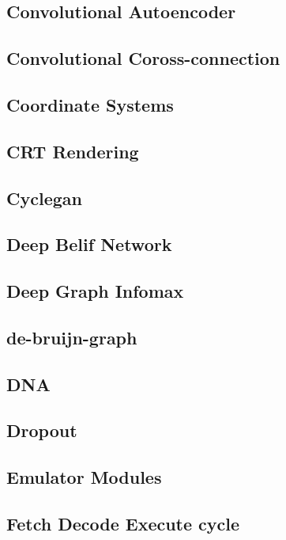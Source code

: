 \documentclass{article}
\newcommand{\example}[1]{
\resizebox{\linewidth}{!}{

}

}
\begin{document}
\subsection{Convolutional Autoencoder}
\example{convolutional_autoencoder}
\subsection{Convolutional Coross-connection}
\example{convolutional_cross-connection}

\subsection{Coordinate Systems}
\example{coordinate_systems}
\subsection{CRT Rendering}
\example{crt_rendering}
\subsection{Cyclegan}
\example{cyclegan}
\subsection{Deep Belif Network}
\example{deep_belief_network}
\subsection{Deep Graph Infomax}
\example{deep_graph_infomax}
\subsection{de-bruijn-graph}
\example{de_bruijn_graph}

\subsection{DNA}
\example{dna}
\subsection{Dropout}
\example{dropout}
\subsection{Emulator Modules}
\example{emulator_modules}
\subsection{Fetch Decode Execute cycle}
\example{fetch-decode-execute_cycle}
\end{document}
